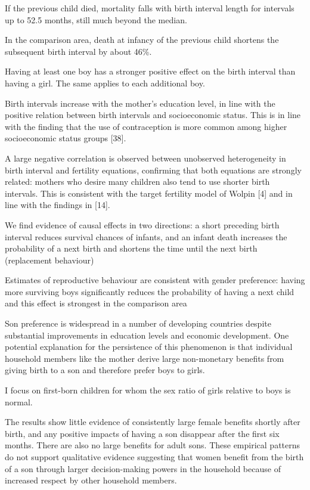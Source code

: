 If the previous child died, mortality falls with birth interval length
for intervals up to 52.5 months, still much beyond the median.

In the comparison area, death at infancy of the previous child shortens
the subsequent birth interval by about 46\%.

Having at least one boy has a stronger positive effect on the birth
interval than having a girl. The same applies to each additional boy.

Birth intervals increase with the mother’s education level, in line with
the positive relation between birth intervals and socioeconomic status.
This is in line with the finding that the use of contraception is more
common among higher socioeconomic status groups [38].

A large negative correlation is observed between unobserved
heterogeneity in birth interval and fertility equations, confirming that
both equations are strongly related: mothers who desire many children
also tend to use shorter birth intervals. This is consistent with the
target fertility model of Wolpin [4] and in line with the findings in
[14].

We find evidence of causal effects in two directions: a short preceding birth interval reduces survival chances of infants, and an infant death increases the probability of a next birth and shortens the time until the next birth (replacement behaviour)

Estimates of reproductive behaviour are consistent with gender preference: having more surviving boys significantly reduces the probability of having a next child and this effect is strongest in the comparison area

\citet{Zimmermann2018}

Son preference is widespread in a number of developing countries despite
substantial improvements in education levels and economic development.
One potential explanation for the persistence of this phenomenon is that
individual household members like the mother derive large non-monetary
beneﬁts from giving birth to a son and therefore prefer boys to girls.

I focus on ﬁrst-born children for whom the sex ratio of girls relative to boys is normal.

The results show little evidence of consistently large female beneﬁts
shortly after birth, and any positive impacts of having a son disappear
after the ﬁrst six months. There are also no large beneﬁts for adult
sons. These empirical patterns do not support qualitative evidence
suggesting that women beneﬁt from the birth of a son through larger
decision-making powers in the household because of increased respect by
other household members.

